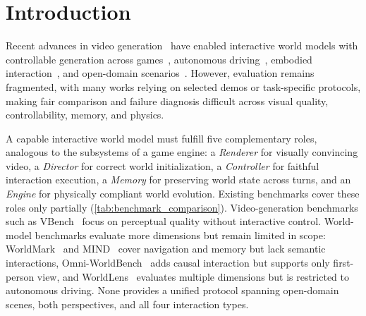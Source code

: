 \section{Introduction}
\label{sec:introduction}

Recent advances in video generation~\cite{ho2020denoising,kong2024hunyuanvideo,wan2025wan,polyak2024moviegen,brooks2024sora} have enabled interactive world models with controllable generation across games~\cite{bruce2024genie,deepmind2024genie2,ball2025genie3,he2025matrixgame2,he2026matrixgame3,li2025hunyuangamecraft,tang2025interbench}, autonomous driving~\cite{hu2023gaia1,gao2024vista}, embodied interaction~\cite{yang2023unisim,zhu2024irasim}, and open-domain scenarios~\cite{sun2025hyworldplay,chen2025yume,mao2025yume15,gao2026lingbot}.
However, evaluation remains fragmented, with many works relying on selected demos or task-specific protocols, making fair comparison and failure diagnosis difficult across visual quality, controllability, memory, and physics.

A capable interactive world model must fulfill five complementary roles, analogous to the subsystems of a game engine: a \emph{Renderer} for visually convincing video, a \emph{Director} for correct world initialization, a \emph{Controller} for faithful interaction execution, a \emph{Memory} for preserving world state across turns, and an \emph{Engine} for physically compliant world evolution. Existing benchmarks cover these roles only partially (\cref{tab:benchmark_comparison}). Video-generation benchmarks such as VBench~\cite{huang2024vbench,zheng2025vbench2} focus on perceptual quality without interactive control. World-model benchmarks evaluate more dimensions but remain limited in scope: WorldMark~\cite{xu2026worldmark} and MIND~\cite{ye2026mind} cover navigation and memory but lack semantic interactions, Omni-WorldBench~\cite{wu2026omniworldbench} adds causal interaction but supports only first-person view, and WorldLens~\cite{worldlens2025} evaluates multiple dimensions but is restricted to autonomous driving. None provides a unified protocol spanning open-domain scenes, both perspectives, and all four interaction types.

